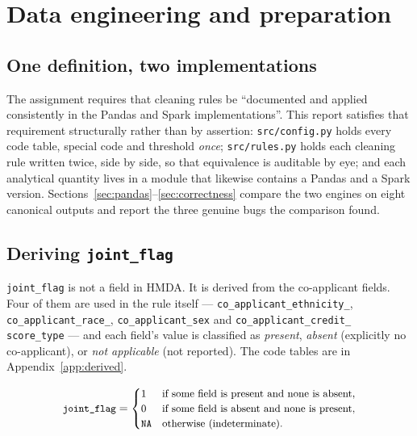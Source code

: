 \documentclass[sigconf,balance=false]{acmart}
\begin{document}


\section{Data engineering and preparation}\label{sec:engineering}

\subsection{One definition, two implementations}

The assignment requires that cleaning rules be ``documented and applied
consistently in the Pandas and Spark implementations''. This report
satisfies that requirement structurally rather than by assertion:
\texttt{src/config.py} holds every code table, special code and threshold
\emph{once}; \texttt{src/rules.py} holds each cleaning rule written twice,
side by side, so that equivalence is auditable by eye; and each analytical
quantity lives in a module that likewise contains a Pandas and a Spark
version. Sections~\ref{sec:pandas}--\ref{sec:correctness} compare the two
engines on eight canonical outputs and report the three genuine bugs the
comparison found.

\subsection{Deriving \texttt{joint\_\allowbreak flag}}

\texttt{joint\_\allowbreak flag} is not a field in HMDA. It is derived from the
co-applicant fields. Four of them are used in the rule itself ---
\texttt{co\_\allowbreak applicant\_\allowbreak ethnicity\_},
\texttt{co\_\allowbreak applicant\_\allowbreak race\_},
\texttt{co\_\allowbreak applicant\_\allowbreak sex} and
\texttt{co\_\allowbreak applicant\_\allowbreak credit\_\allowbreak
score\_\allowbreak type} --- and each field's value is classified as
\emph{present}, \emph{absent} (explicitly no co-applicant), or \emph{not
applicable} (not reported). The code tables are in
Appendix~\ref{app:derived}.


\begin{equation}
\small
\texttt{joint\_flag} =
\begin{cases}
1 & \text{if some field is present and none is absent,} \\
0 & \text{if some field is absent and none is present,} \\
\texttt{NA} & \text{otherwise (indeterminate).}
\end{cases}
\label{eq:jointflag}
\end{equation}
\end{document}

